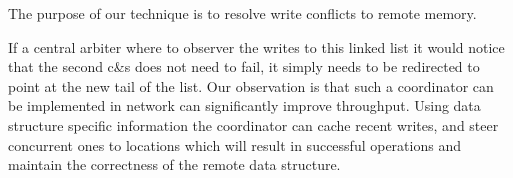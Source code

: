 The purpose of our technique is to resolve write conflicts to remote
memory.





If a central arbiter where to observer the writes to this linked list
it would notice that the second c\&s does not need to fail, it simply
needs to be redirected to point at the new tail of the list. 
Our observation is that such a coordinator can be implemented in
network can significantly improve throughput. Using data structure
specific information the coordinator can cache recent writes, and
steer concurrent ones to locations which will result in successful
operations and maintain the correctness of the remote data structure.

